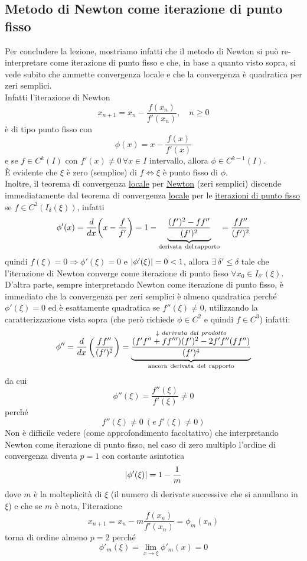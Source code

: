 \documentclass[12pt]{article}
\DeclarePairedDelimiter{\abs}{\lvert}{\rvert}
\begin{document}
\subsection{Metodo di Newton come iterazione di punto fisso}
Per concludere la lezione, mostriamo infatti che il metodo di Newton si può re-interpretare come iterazione di punto fisso e che, in base a quanto visto sopra, si vede subito che ammette convergenza locale e che la convergenza è quadratica per zeri semplici.\\
Infatti l'iterazione di Newton
\[x_{n+1} = x_n - \frac{f(x_n)}{f'(x_n)}, \quad n\ge 0\]
è di tipo punto fisso con
\[\phi(x) = x - \frac{f(x)}{f'(x)}\]
e se $f \in C^k(I)$ con $f'(x)\ne 0 \,\forall x \in I$ intervallo, allora $\phi \in C^{k-1}(I)$.\\
È evidente che $\xi$ è zero (semplice) di $f \iff \xi$ è punto fisso di $\phi$.\\
Inoltre, il teorema di convergenza \uline{locale} per \uline{Newton} (zeri semplici) discende immediatamente dal teorema di convergenza \uline{locale} per le \uline{iterazioni di punto fisso} se $f \in C^2(I_\delta(\xi))$, infatti
\[ \phi'(x) = \frac{d}{dx}\biggl(x-\frac{f}{f'}\biggr) = 1 - \underbrace{\frac{(f')^2 - ff''}{(f')^2}}_{\text{derivata\, del\,rapporto}} = \frac{ff''}{(f')^2}\]
quindi $f(\xi)=0 \Rightarrow \phi'(\xi)=0$ e $\abs{\phi'(\xi)}=0<1$, allora $\exists\, \delta'\le \delta$ tale che l'iterazione di Newton converge come iterazione di punto fisso $\forall x_0 \in I_{\delta'}(\xi)$.\\
D'altra parte, sempre interpretando Newton come iterazione di punto fisso, è immediato che la convergenza per zeri semplici è almeno quadratica perché $\phi'(\xi)=0$ ed è esattamente quadratica se $f''(\xi)\neq0$, utilizzando la caratterizzazione vista sopra (che però richiede $\phi \in C^2$ e quindi $f\in C^3$) infatti:
\[\phi''=\frac{d}{dx}\left(\frac{f f''}{(f')^2}\right)= \underbrace{\frac{\overset{ \downarrow \ derivata \ del \ prodotto}{(f' f''+f f''')(f')^2-2 f' f'' (f f'')}}{(f')^4}}_{\text{ancora\, derivata\, del\, rapporto}}\]
da cui 
\[ \phi''(\xi)=\frac{f''(\xi)}{f'(\xi)}\neq 0 \]
perché 
\begin{equation*}
    f''(\xi)\neq 0 \ ( e \ f'(\xi)\neq0)
\end{equation*}
Non è difficile vedere (come approfondimento facoltativo) che interpretando Newton come iterazione di punto fisso, nel caso di zero multiplo l'ordine di convergenza diventa $p=1$ con costante asintotica 
\[\abs{\phi'(\xi)}=1-\frac{1}{m}\] 
dove $m$ è la molteplicità di $\xi$ (il numero di derivate successive che si annullano in $\xi$) e che se $m$ è nota, l'iterazione
\[x_{n+1}=x_n-m\frac{f(x_n)}{f'(x_n)}=\phi_m(x_n)\]
torna di ordine almeno $p=2$ perché 
\[\phi'_m(\xi)=\lim_{x\to\xi}\phi'_m(x)=0\]
\end{document}
